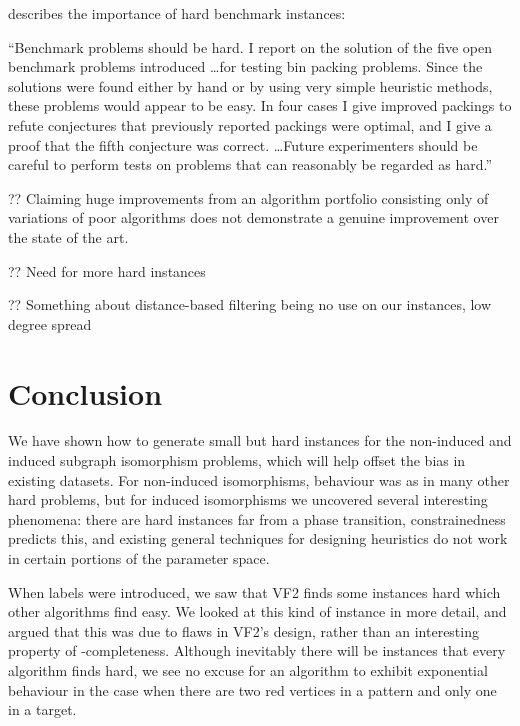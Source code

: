 \documentclass[twoside,11pt]{article}
\newcommand{\citet}[1]{\citeA{#1}}
\begin{document}
\citet{DBLP:journals/heuristics/Gent98} describes the importance of hard benchmark instances:

\begin{displayquote}
    ``Benchmark problems should be hard. I report on the solution of the five open benchmark
    problems introduced \ldots for testing bin packing problems. Since the solutions were found
    either by hand or by using very simple heuristic methods, these problems would appear to be
    easy. In four cases I give improved packings to refute conjectures that previously reported
    packings were optimal, and I give a proof that the fifth conjecture was correct. \ldots Future
    experimenters should be careful to perform tests on problems that can reasonably be regarded as
    hard.''
\end{displayquote}

?? Claiming huge improvements from an algorithm portfolio consisting only of variations of poor
algorithms does not demonstrate a genuine improvement over the state of the art.

?? Need for more hard instances

?? Something about distance-based filtering being no use on our instances, low degree spread

\section{Conclusion}

We have shown how to generate small but hard instances for the non-induced and induced subgraph
isomorphism problems, which will help offset the bias in existing datasets. For non-induced
isomorphisms, behaviour was as in many other hard problems, but for induced isomorphisms we
uncovered several interesting phenomena: there are hard instances far from a phase transition,
constrainedness predicts this, and existing general techniques for designing heuristics do not work
in certain portions of the parameter space.

When labels were introduced, we saw that VF2 finds some instances hard which other algorithms find
easy. We looked at this kind of instance in more detail, and argued that this was due to flaws in
VF2's design, rather than an interesting property of \NP-completeness. Although inevitably there
will be instances that every algorithm finds hard, we see no excuse for an algorithm to exhibit
exponential behaviour in the case when there are two red vertices in a pattern and only one in a
target.
\end{document}
